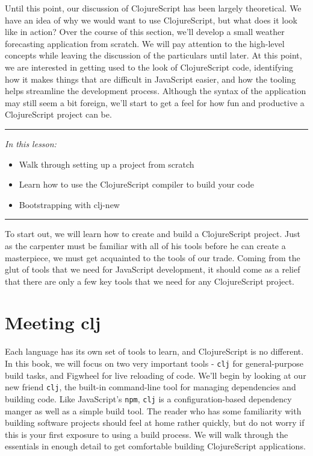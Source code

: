 \documentclass[10pt,twoside,openright]{memoir}
\begin{document}
Until this point, our discussion of ClojureScript has been largely
theoretical. We have an idea of why we would want to use ClojureScript,
but what does it look like in action? Over the course of this section,
we'll develop a small weather forecasting application from scratch. We
will pay attention to the high-level concepts while leaving the
discussion of the particulars until later. At this point, we are
interested in getting used to the look of ClojureScript code,
identifying how it makes things that are difficult in JavaScript easier,
and how the tooling helps streamline the development process. Although
the syntax of the application may still seem a bit foreign, we'll start
to get a feel for how fun and productive a ClojureScript project can be.

\begin{center}\rule{0.5\linewidth}{0.5pt}\end{center}

\emph{In this lesson:}

\begin{itemize}
\tightlist
\item
  Walk through setting up a project from scratch
\item
  Learn how to use the ClojureScript compiler to build your code
\item
  Bootstrapping with clj-new
\end{itemize}

\begin{center}\rule{0.5\linewidth}{0.5pt}\end{center}

To start out, we will learn how to create and build a ClojureScript
project. Just as the carpenter must be familiar with all of his tools
before he can create a masterpiece, we must get acquainted to the tools
of our trade. Coming from the glut of tools that we need for JavaScript
development, it should come as a relief that there are only a few key
tools that we need for any ClojureScript project.

\section{Meeting clj}

Each language has its own set of tools to learn, and ClojureScript is no
different. In this book, we will focus on two very important tools -
\texttt{clj} for general-purpose build tasks, and Figwheel for live
reloading of code. We'll begin by looking at our new friend
\texttt{clj}, the built-in command-line tool for managing dependencies
and building code. Like JavaScript's \texttt{npm}, \texttt{clj} is a
configuration-based dependency manger as well as a simple build tool.
The reader who has some familiarity with building software projects
should feel at home rather quickly, but do not worry if this is your
first exposure to using a build process. We will walk through the
essentials in enough detail to get comfortable building ClojureScript
applications.
\end{document}
